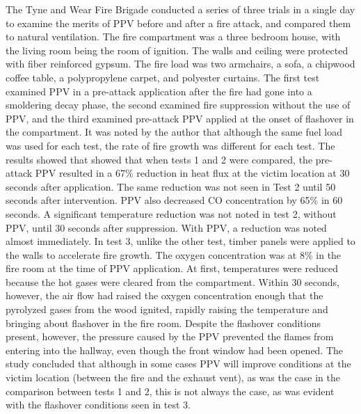 \documentclass{article}
\begin{document}
The Tyne and Wear Fire Brigade conducted a series of three trials in a single day to examine the merits of PPV before and after a fire attack, and compared them to natural ventilation. The fire compartment was a three bedroom house, with the living room being the room of ignition. The walls and ceiling were protected with fiber reinforced gypsum. The fire load was two armchairs, a sofa, a chipwood coffee table, a polypropylene carpet, and polyester curtains. The first test examined PPV in a pre-attack application after the fire had gone into a smoldering decay phase, the second examined fire suppression without the use of PPV, and the third examined pre-attack PPV applied at the onset of flashover in the compartment. It was noted by the author that although the same fuel load was used for each test, the rate of fire growth was different for each test. The results showed that showed that when tests 1 and 2 were compared, the pre-attack PPV resulted in a 67\% reduction in heat flux at the victim location at 30 seconds after application. The same reduction was not seen in Test 2 until 50 seconds after intervention. PPV also decreased CO concentration by 65\% in 60 seconds. A significant temperature reduction was not noted in test 2, without PPV, until 30 seconds after suppression. With PPV, a reduction was noted almost immediately. In test 3, unlike the other test, timber panels were applied to the walls to accelerate fire growth. The oxygen concentration was at 8\% in the fire room at the time of PPV application. At first, temperatures were reduced because the hot gases were cleared from the compartment. Within 30 seconds, however, the air flow had raised the oxygen concentration enough that the pyrolyzed gases from the wood ignited, rapidly raising the temperature and bringing about flashover in the fire room. Despite the flashover conditions present, however, the pressure caused by the PPV prevented the flames from entering into the hallway, even though the front window had been opened. The study concluded that although in some cases PPV will improve conditions at the victim location (between the fire and the exhaust vent), as was the case in the comparison between tests 1 and 2, this is not always the case, as was evident with the flashover conditions seen in test 3.\cite{Tyne&Wearauthorless}\\
	
\end{document}
